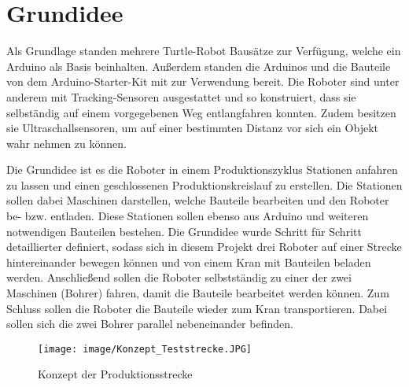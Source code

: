 

\section{Grundidee}

Als Grundlage standen mehrere Turtle-Robot Bausätze zur Verfügung, welche ein Arduino als Basis beinhalten. Außerdem
standen die Arduinos und die Bauteile von dem Arduino-Starter-Kit mit zur Verwendung bereit. Die Roboter
sind unter anderem mit Tracking-Sensoren ausgestattet und so konstruiert, dass sie selbständig
auf einem vorgegebenen Weg entlangfahren konnten. Zudem besitzen sie Ultraschallsensoren,
um auf einer bestimmten Distanz vor sich ein Objekt wahr nehmen zu können.


Die Grundidee ist es die Roboter in einem Produktionszyklus Stationen anfahren zu lassen und einen geschlossenen Produktionskreislauf zu erstellen.  Die Stationen sollen dabei Maschinen darstellen, welche Bauteile bearbeiten und den Roboter be- bzw. entladen. Diese Stationen sollen ebenso aus Arduino und weiteren notwendigen Bauteilen  bestehen. Die Grundidee wurde Schritt für Schritt detaillierter definiert, sodass sich in diesem Projekt drei Roboter auf einer Strecke hintereinander bewegen können und von einem Kran mit Bauteilen beladen werden. Anschließend sollen die Roboter selbstständig zu einer der zwei Maschinen (Bohrer) fahren, damit die Bauteile bearbeitet werden können. Zum Schluss sollen die Roboter die Bauteile wieder zum
Kran transportieren. Dabei sollen sich die zwei Bohrer parallel nebeneinander befinden. 

\begin{figure}[h]
	\begin{center}
		\texttt{[image: image/Konzept\_Teststrecke.JPG]}
		\caption{Konzept der Produktionsstrecke}
		\label{Grundidee}
	\end{center}
\end{figure}

